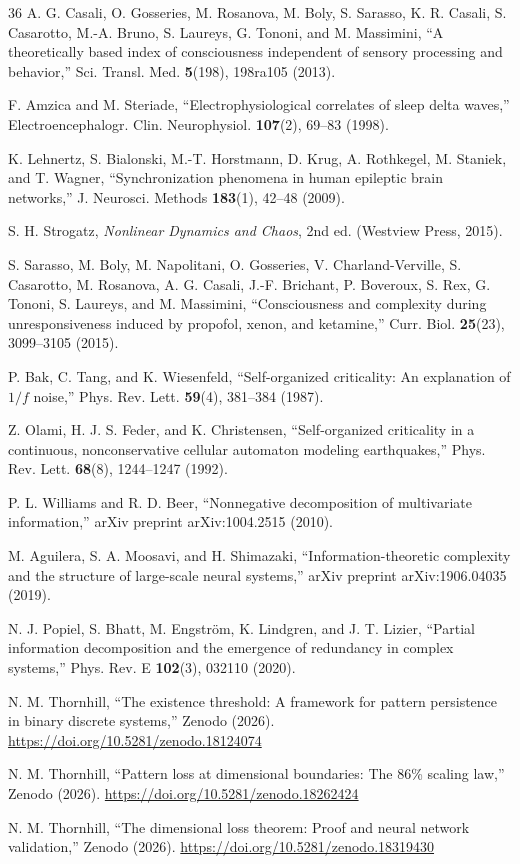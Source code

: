 \documentclass[aip,cha,reprint,amsmath,amssymb,final,floatfix]{revtex4-2}
\begin{document}
\begin{thebibliography}{36}
 A. G. Casali, O. Gosseries, M. Rosanova, M. Boly, S. Sarasso, K. R. Casali, S. Casarotto, M.-A. Bruno, S. Laureys, G. Tononi, and M. Massimini, ``A theoretically based index of consciousness independent of sensory processing and behavior,'' Sci. Transl. Med. \textbf{5}(198), 198ra105 (2013).

 F. Amzica and M. Steriade, ``Electrophysiological correlates of sleep delta waves,'' Electroencephalogr. Clin. Neurophysiol. \textbf{107}(2), 69--83 (1998).

 K. Lehnertz, S. Bialonski, M.-T. Horstmann, D. Krug, A. Rothkegel, M. Staniek, and T. Wagner, ``Synchronization phenomena in human epileptic brain networks,'' J. Neurosci. Methods \textbf{183}(1), 42--48 (2009).

 S. H. Strogatz, \emph{Nonlinear Dynamics and Chaos}, 2nd ed. (Westview Press, 2015).

 S. Sarasso, M. Boly, M. Napolitani, O. Gosseries, V. Charland-Verville, S. Casarotto, M. Rosanova, A. G. Casali, J.-F. Brichant, P. Boveroux, S. Rex, G. Tononi, S. Laureys, and M. Massimini, ``Consciousness and complexity during unresponsiveness induced by propofol, xenon, and ketamine,'' Curr. Biol. \textbf{25}(23), 3099--3105 (2015).

 P. Bak, C. Tang, and K. Wiesenfeld, ``Self-organized criticality: An explanation of $1/f$ noise,'' Phys. Rev. Lett. \textbf{59}(4), 381--384 (1987).

 Z. Olami, H. J. S. Feder, and K. Christensen, ``Self-organized criticality in a continuous, nonconservative cellular automaton modeling earthquakes,'' Phys. Rev. Lett. \textbf{68}(8), 1244--1247 (1992).

 P. L. Williams and R. D. Beer, ``Nonnegative decomposition of multivariate information,'' arXiv preprint arXiv:1004.2515 (2010).

 M. Aguilera, S. A. Moosavi, and H. Shimazaki, ``Information-theoretic complexity and the structure of large-scale neural systems,'' arXiv preprint arXiv:1906.04035 (2019).

 N. J. Popiel, S. Bhatt, M. Engstr{\"o}m, K. Lindgren, and J. T. Lizier, ``Partial information decomposition and the emergence of redundancy in complex systems,'' Phys. Rev. E \textbf{102}(3), 032110 (2020).

 N. M. Thornhill, ``The existence threshold: A framework for pattern persistence in binary discrete systems,'' Zenodo (2026). \url{https://doi.org/10.5281/zenodo.18124074}

 N. M. Thornhill, ``Pattern loss at dimensional boundaries: The 86\% scaling law,'' Zenodo (2026). \url{https://doi.org/10.5281/zenodo.18262424}

 N. M. Thornhill, ``The dimensional loss theorem: Proof and neural network validation,'' Zenodo (2026). \url{https://doi.org/10.5281/zenodo.18319430}

\end{thebibliography}
\end{document}
